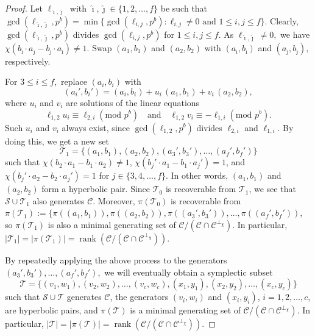 \documentclass{article}
\DeclareMathOperator{\rank}{rank}
\theoremstyle{remark}
\theoremstyle{definition}
\numberwithin{equation}{section}
\begin{document}
\begin{proof}
Let $\ell_{\hat{\imath},\hat{\jmath}}$ with $\hat\imath,\hat\jmath \in \{1,2, \ldots,f\}$ be such that
$\gcd(\ell_{\hat\imath,\hat\jmath},p^b)=\min\{\gcd(\ell_{i,j},p^b) : \ell_{i,j}\neq 0 \text{~and~} 1 \leq i,j \leq f \}.$ Clearly, $\gcd(\ell_{\hat\imath,\hat\jmath},p^b)$ divides $\gcd(\ell_{i,j},p^b)$ for $1 \leq i,j \leq f.$
 As $\ell_{\hat\imath,\hat\jmath}\neq 0,$  we have  $\chi(b_{\hat\imath} \cdot a_{\hat\jmath} - b_{\hat\jmath} \cdot a_{\hat\imath}) \neq 1.$   Swap $(a_1,b_1)$ and $(a_2,b_2)$  with $(a_{\hat\imath},b_{\hat\imath})$ and $(a_{\hat\jmath},b_{\hat\jmath}),$ respectively.

For $3 \leq i \leq f,$   replace $ (a_i,b_i)$ with 
 $$(a_i',b_i')=(a_i,b_i) +u_i \, (a_1,b_1) + v_i \, (a_2,b_2),$$ 
 where $u_i$ and $v_i$ are solutions of the linear equations 
$$\ell_{1,2}u_i\equiv\ell_{2,i}(\text{mod~}p^b) \ \ \ \text{ and } \ \ \ \ell_{1,2}v_i\equiv-\ell_{1,i}(\text{mod~}p^b).$$
Such $u_i$ and $v_i$ always exist, since $\gcd(\ell_{1,2},p^b)$ divides $\ell_{2,i}$ and $\ell_{1,i}$. By doing this, we get a new set 
$$\mathcal{T}_1 = \{(a_1,b_1),(a_2,b_2),(a_3',b_3'),\ldots,(a_f',b_f')\}$$
such that $\chi(b_2 \cdot a_1-b_1 \cdot a_2)\neq1$, $\chi(b_j' \cdot a_1-b_1 \cdot a_j')=1$, and $\chi(b_j' \cdot a_2-b_2 \cdot a_j')=1$  for $j \in \{3,4,\ldots,f\}$. In other words, $(a_1,b_1)$ and $(a_2,b_2)$ form a hyperbolic pair. Since $\mathcal{T}_0$ is recoverable from $\mathcal{T}_1$, we see that $\mathcal{S} \cup \mathcal{T}_1$ also generates $\mathcal{C}$. Moreover, $\pi(\mathcal{T}_0)$ is recoverable from $\pi(\mathcal{T}_1) := \{\pi((a_1,b_1)),\pi((a_2,b_2)),\pi((a_3',b_3')),\ldots,\pi((a_f',b_f'))$, so $\pi(\mathcal{T}_1)$ is also a minimal generating set of $\mathcal{C}/(\mathcal{C} \cap \mathcal{C}^{\perp_\chi})$. In particular, $|\mathcal{T}_1| = |\pi(\mathcal{T}_1)| = \rank(\mathcal{C}/(\mathcal{C} \cap \mathcal{C}^{\perp_\chi}))$.

By repeatedly applying the above process to the generators $(a_3',b_3'),\ldots,(a_f',b_f'),$ we will eventually obtain a symplectic subset 
 $$\mathcal{T} = \{(v_1,w_1),(v_2,w_2),\ldots,(v_{c},w_{c}),(x_1,y_1),(x_2,y_2),\ldots, (x_{c},y_{c})\}$$ 
such that $\mathcal{S} \cup \mathcal{T}$ generates $\mathcal{C}$, the generators $(v_i,w_i)$ and $(x_i,y_i)$, $i=1,2,\ldots,c$, are hyperbolic pairs, and $\pi(\mathcal{T})$ is a minimal generating set of $\mathcal{C}/(\mathcal{C} \cap \mathcal{C}^{\perp_\chi})$. In particular, $|\mathcal{T}| = |\pi(\mathcal{T})| = \rank(\mathcal{C}/(\mathcal{C} \cap \mathcal{C}^{\perp_\chi}))$.



\end{proof}
\end{document}
